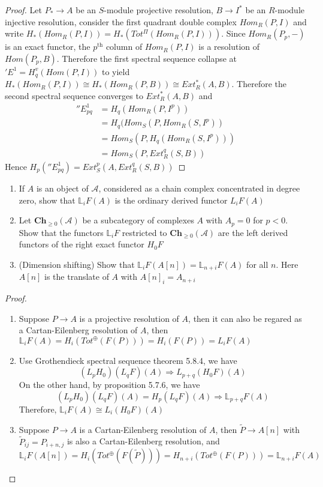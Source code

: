 \documentclass{article}
\newenvironment{exercise}[2][Exercise]{\begin{trivlist}
\item[\hskip \labelsep {\bfseries #1}\hskip \labelsep {\bfseries #2.}]}{\end{trivlist}}
\theoremstyle{definition}
\theoremstyle{remark}
\theoremstyle{definition}
\renewcommand{\tilde}{\widetilde}
\begin{document}
\begin{proof}
Let $P_*\to A$ be an $S$-module projective resolution, $B\to I^*$ be an $R$-module injective resolution, consider the first quadrant double complex $Hom_R(P,I)$ and write $H_*(Hom_R(P,I))=H_*(Tot^{\Pi}(Hom_R(P,I)))$. Since $Hom_R(P_p,-)$ is an exact functor, the $p^\text{th}$ column of $Hom_R(P,I)$ is a resolution of $Hom(P_p,B)$. Therefore the first spectral sequence collapse at $'E^1=H^v_q(Hom(P,I))$ to yield $H_*(Hom_R(P,I))\cong H_*(Hom_R(P,B))\cong Ext_R^*(A,B)$. Therefore the second spectral sequence converges to $Ext_R^*(A,B)$ and
\begin{align*}
''E^1_{pq}&=H_q(Hom_R(P,I^p)) \\
&=H_q(Hom_S(P,Hom_R(S,I^p)) \\
&=Hom_S(P,H_q(Hom_R(S,I^p))) \\
&=Hom_S(P,Ext_R^q(S,B))
\end{align*}
Hence $H_p(''E^1_{pq})=Ext_S^p(A,Ext_R^q(S,B))$
\end{proof}

\begin{exercise}{\textbf{5.7.4}} \hfill
\begin{enumerate}[label=\textbf{\arabic*.}, leftmargin=*]
\item If $A$ is an object of $\mathcal A$, considered as a chain complex concentrated in degree zero, show that $\mathbb L_iF(A)$ is the ordinary derived functor $L_iF(A)$
\item Let $\mathbf{Ch}_{\geq0}(\mathcal A)$ be a subcategory of complexes $A$ with $A_p=0$ for $p<0$. Show that the functors $\mathbb L_iF$ restricted to $\mathbf{Ch}_{\geq0}(\mathcal A)$ are the left derived functors of the right exact functor $H_0F$
\item (Dimension shifting)
Show that $\mathbb L_iF(A[n])=\mathbb L_{n+i}F(A)$ for all $n$. Here $A[n]$ is the translate of $A$ with $A[n]_i=A_{n+i}$
\end{enumerate}
\end{exercise}

\begin{proof} \hfill
\begin{enumerate}[label=\textbf{\arabic*.}, leftmargin=*]
\item Suppose $P\to A$ is a projective resolution of $A$, then it can also be regared as a Cartan-Eilenberg resolution of $A$, then $\mathbb L_iF(A)=H_i(Tot^\oplus(F(P)))=H_i(F(P))=L_iF(A)$
\item Use Grothendieck spectral sequence theorem 5.8.4, we have
\[(L_pH_0)(L_qF)(A)\Rightarrow L_{p+q}(H_0F)(A)\]
On the other hand, by proposition 5.7.6, we have
\[(L_pH_0)(L_qF)(A)=H_p(L_qF)(A)\Rightarrow\mathbb L_{p+q}F(A)\]
Therefore, $\mathbb L_iF(A)\cong L_i(H_0F)(A)$
\item Suppose $P\to A$ is a Cartan-Eilenberg resolution of $A$, then $\tilde P\to A[n]$ with $\tilde P_{ij}=P_{i+n,j}$ is also a Cartan-Eilenberg resolution, and
\[\mathbb L_iF(A[n])=H_i(Tot^\oplus(F(\tilde P)))=H_{n+i}(Tot^\oplus(F(P)))=\mathbb L_{n+i}F(A)\]
\end{enumerate}
\end{proof}
\end{document}
